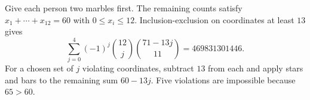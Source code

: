 Give each person two marbles first. The remaining counts satisfy $x_1+\cdots+x_{12}=60$ with $0\le x_i\le12$. Inclusion-exclusion on coordinates at least $13$ gives\[\sum_{j=0}^{4}(-1)^j\binom{12}{j}\binom{71-13j}{11}=\boxed{469831301446}.\]For a chosen set of $j$ violating coordinates, subtract $13$ from each and apply stars and bars to the remaining sum $60-13j$. Five violations are impossible because $65>60$.
